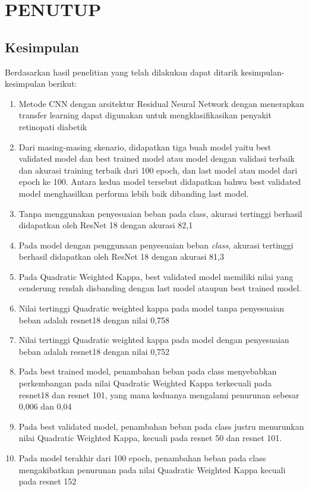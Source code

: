 \chapter{PENUTUP}
\label{chap:penutup}


\section{Kesimpulan}
\label{sec:kesimpulan}

Berdasarkan hasil penelitian yang telah dilakukan dapat ditarik kesimpulan-kesimpulan berikut:

\begin{enumerate}[nolistsep]
	
\item Metode CNN dengan arsitektur Residual Neural Network dengan menerapkan transfer learning dapat digunakan untuk mengklasifikasikan penyakit retinopati diabetik
\item Dari masing-masing skenario, didapatkan tiga buah model yaitu best validated model dan best trained model atau model dengan validasi terbaik dan akurasi training terbaik dari 100 epoch, dan last model atau model dari epoch ke 100. Antara kedua model tersebut didapatkan bahwa best validated model menghasilkan performa lebih baik dibanding last model.
\item Tanpa menggunakan penyesuaian beban pada class, akurasi tertinggi berhasil didapatkan oleh ResNet 18 dengan akurasi 82,1%
\item Pada model dengan penggunaan penyesuaian beban \emph{class}, akurasi tertinggi berhasil didapatkan oleh ResNet 18 dengan akurasi 81,3%
\item Pada Quadratic Weighted Kappa, best validated model memiliki nilai yang cenderung rendah disbanding dengan last model ataupun best trained model. 
\item Nilai tertinggi Quadratic weighted kappa pada model tanpa penyesuaian beban adalah resnet18 dengan nilai 0,758
\item Nilai tertinggi Quadratic weighted kappa pada model dengan penyesuaian beban adalah resnet18 dengan nilai 0,752
\item Pada best trained model, penambahan beban pada class menyebabkan perkembangan pada nilai Quadratic Weighted Kappa terkecuali pada resnet18 dan resnet 101, yang mana keduanya mengalami penurunan sebesar 0,006 dan 0,04
\item Pada best validated model, penambahan beban pada class justru menurunkan nilai Quadratic Weighted Kappa, kecuali pada resnet 50 dan resnet 101.
\item Pada model terakhir dari 100 epoch, penambahan beban pada class mengakibatkan penurunan pada nilai Quadratic Weighted Kappa kecuali pada resnet 152


\end{enumerate}

